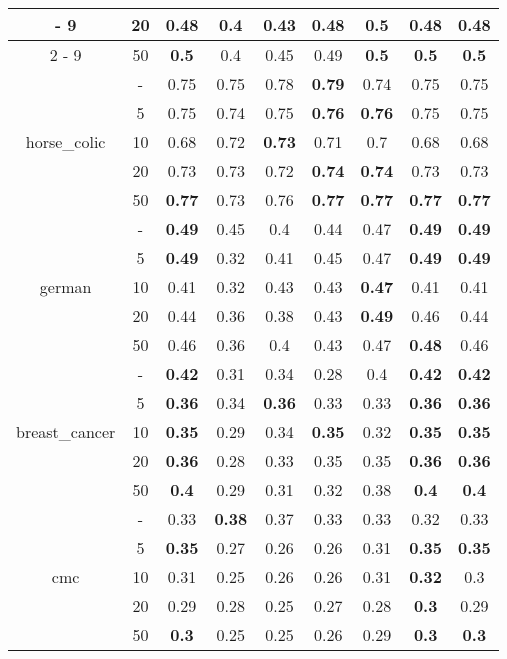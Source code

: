 \documentclass{article}%
\begin{document}
\begin{tabular}{c|c|ccccccc}
{-%
9}%
&20&0.48&0.4&0.43&0.48&\textbf{0.5}&0.48&0.48\\%
\cline{2%
-%
9}%
&50&\textbf{0.5}&0.4&0.45&0.49&\textbf{0.5}&\textbf{0.5}&\textbf{0.5}\\%
\hline%
\multirow{5}{*}{horse\_colic}&{-}&0.75&0.75&0.78&\textbf{0.79}&0.74&0.75&0.75\\%
\cline{2%
-%
9}%
&5&0.75&0.74&0.75&\textbf{0.76}&\textbf{0.76}&0.75&0.75\\%
\cline{2%
-%
9}%
&10&0.68&0.72&\textbf{0.73}&0.71&0.7&0.68&0.68\\%
\cline{2%
-%
9}%
&20&0.73&0.73&0.72&\textbf{0.74}&\textbf{0.74}&0.73&0.73\\%
\cline{2%
-%
9}%
&50&\textbf{0.77}&0.73&0.76&\textbf{0.77}&\textbf{0.77}&\textbf{0.77}&\textbf{0.77}\\%
\hline%
\multirow{5}{*}{german}&{-}&\textbf{0.49}&0.45&0.4&0.44&0.47&\textbf{0.49}&\textbf{0.49}\\%
\cline{2%
-%
9}%
&5&\textbf{0.49}&0.32&0.41&0.45&0.47&\textbf{0.49}&\textbf{0.49}\\%
\cline{2%
-%
9}%
&10&0.41&0.32&0.43&0.43&\textbf{0.47}&0.41&0.41\\%
\cline{2%
-%
9}%
&20&0.44&0.36&0.38&0.43&\textbf{0.49}&0.46&0.44\\%
\cline{2%
-%
9}%
&50&0.46&0.36&0.4&0.43&0.47&\textbf{0.48}&0.46\\%
\hline%
\multirow{5}{*}{breast\_cancer}&{-}&\textbf{0.42}&0.31&0.34&0.28&0.4&\textbf{0.42}&\textbf{0.42}\\%
\cline{2%
-%
9}%
&5&\textbf{0.36}&0.34&\textbf{0.36}&0.33&0.33&\textbf{0.36}&\textbf{0.36}\\%
\cline{2%
-%
9}%
&10&\textbf{0.35}&0.29&0.34&\textbf{0.35}&0.32&\textbf{0.35}&\textbf{0.35}\\%
\cline{2%
-%
9}%
&20&\textbf{0.36}&0.28&0.33&0.35&0.35&\textbf{0.36}&\textbf{0.36}\\%
\cline{2%
-%
9}%
&50&\textbf{0.4}&0.29&0.31&0.32&0.38&\textbf{0.4}&\textbf{0.4}\\%
\hline%
\multirow{5}{*}{cmc}&{-}&0.33&\textbf{0.38}&0.37&0.33&0.33&0.32&0.33\\%
\cline{2%
-%
9}%
&5&\textbf{0.35}&0.27&0.26&0.26&0.31&\textbf{0.35}&\textbf{0.35}\\%
\cline{2%
-%
9}%
&10&0.31&0.25&0.26&0.26&0.31&\textbf{0.32}&0.3\\%
\cline{2%
-%
9}%
&20&0.29&0.28&0.25&0.27&0.28&\textbf{0.3}&0.29\\%
\cline{2%
-%
9}%
&50&\textbf{0.3}&0.25&0.25&0.26&0.29&\textbf{0.3}&\textbf{0.3}\\%

\end{tabular}
\end{document}
